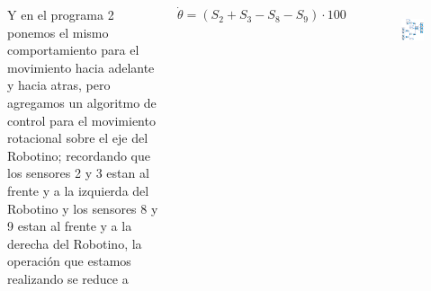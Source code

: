 \begin{frame}
	\begin{columns}
		Y en el programa 2 ponemos el mismo comportamiento para el movimiento hacia adelante y hacia atras, pero agregamos un algoritmo de control para el movimiento rotacional sobre el eje del Robotino; recordando que los sensores 2 y 3 estan al frente y a la izquierda del Robotino y los sensores 8 y 9 estan al frente y a la derecha del Robotino, la operación que estamos realizando se reduce a

		\begin{equation*}
			\dot{\theta} = (S_2 + S_3 - S_8 - S_9)\cdot 100
		\end{equation*}

		\begin{figure}
			\begin{center}
				\includegraphics[width=0.95\textwidth]{images/00-control-multiple/02.png}
				\label{fig:multiple-02}
			\end{center}
		\end{figure}
	\end{columns}
\end{frame}


